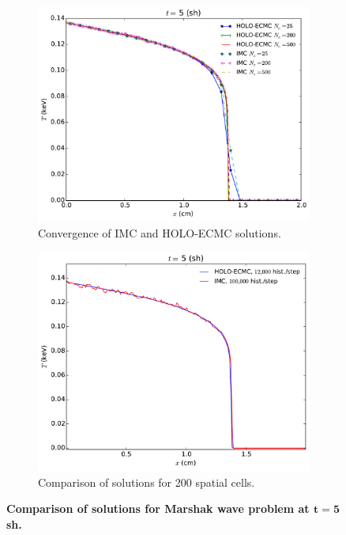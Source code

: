 \documentclass{mc2013}
\begin{document}
\begin{figure}[htb]
\begin{subfigure}{0.5\textwidth}
  \centering
    \includegraphics[width=0.99\linewidth]{marshak_mesh_conv.pdf}
    \caption{\label{marshak_mesh_conv} Convergence of IMC and HOLO-ECMC solutions.}
\end{subfigure}
\begin{subfigure}{0.5\textwidth}
  \centering
  \includegraphics[width=0.99\linewidth]{marshak_200_compare.pdf}
  \caption{\label{marshak_200_compare}  Comparison of solutions for 200 spatial cells. }
\end{subfigure}
\caption{\bf Comparison of solutions for Marshak wave problem at $\mathbf{t=5}$ sh.}
\end{figure}
\end{document}
